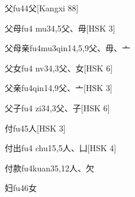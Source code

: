 \begin{EntryWithPhonetic}{父}{fu4}{4}{⽗}[Kangxi 88]
\end{EntryWithPhonetic}

\begin{EntryWithPhonetic}{父母}{fu4 mu3}{4,5}{⽗、⽏}[HSK 3]
\end{EntryWithPhonetic}

\begin{EntryWithPhonetic}{父母亲}{fu4mu3qin1}{4,5,9}{⽗、⽏、⼇}
\end{EntryWithPhonetic}

\begin{EntryWithPhonetic}{父女}{fu4 nv3}{4,3}{⽗、⼥}[HSK 6]
\end{EntryWithPhonetic}

\begin{EntryWithPhonetic}{父亲}{fu4qin1}{4,9}{⽗、⼇}[HSK 3]
\end{EntryWithPhonetic}

\begin{EntryWithPhonetic}{父子}{fu4 zi3}{4,3}{⽗、⼦}[HSK 6]
\end{EntryWithPhonetic}

\begin{EntryWithPhonetic}{付}{fu4}{5}{⼈}[HSK 3]
\end{EntryWithPhonetic}

\begin{EntryWithPhonetic}{付出}{fu4 chu1}{5,5}{⼈、⼐}[HSK 4]
\end{EntryWithPhonetic}

\begin{EntryWithPhonetic}{付款}{fu4kuan3}{5,12}{⼈、⽋}
\end{EntryWithPhonetic}

\begin{EntryWithPhonetic}{妇}{fu4}{6}{⼥}
\end{EntryWithPhonetic}

